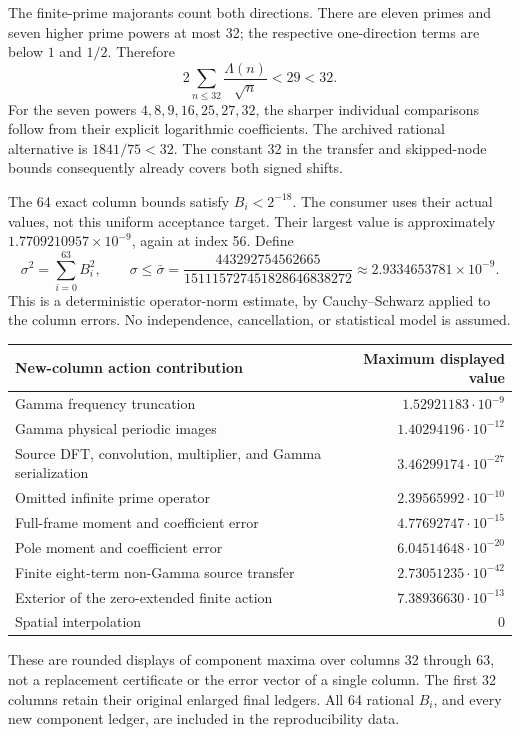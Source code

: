 \documentclass[11pt,a4paper]{article}
\numberwithin{equation}{section}
\theoremstyle{definition}\newtheorem{definition}[theorem]{Definition}
\theoremstyle{remark}\newtheorem{remark}[theorem]{Remark}
\begin{document}
The finite-prime majorants count both directions. There are eleven primes and seven higher prime powers at most 32; the respective one-direction terms are below $1$ and $1/2$. Therefore
\begin{equation}\label{eq:prime32directions}
 2\sum_{n\le32}\frac{\Lambda(n)}{\sqrt n}<29<32.
\end{equation}
For the seven powers $4,8,9,16,25,27,32$, the sharper individual comparisons follow from their explicit logarithmic coefficients. The archived rational alternative is $1841/75<32$. The constant 32 in the transfer and skipped-node bounds consequently already covers both signed shifts.

The 64 exact column bounds satisfy $B_i<2^{-18}$. The consumer uses their actual values, not this uniform acceptance target. Their largest value is approximately $1.7709210957\times10^{-9}$, again at index 56. Define
\begin{equation}\label{eq:sigma64}
 \sigma^2=\sum_{i=0}^{63}B_i^2,\qquad
 \sigma\le\bar\sigma=
 \frac{443292754562665}{151115727451828646838272}
 \approx2.9334653781\times10^{-9}.
\end{equation}
This is a deterministic operator-norm estimate, by Cauchy--Schwarz applied to the column errors. No independence, cancellation, or statistical model is assumed.

\begingroup\small
\begin{longtable}{>{\raggedright\arraybackslash}p{.67\linewidth}r}
\toprule
New-column action contribution & Maximum displayed value\\
\midrule\endhead
Gamma frequency truncation & $1.52921183\cdot10^{-9}$\\
Gamma physical periodic images & $1.40294196\cdot10^{-12}$\\
Source DFT, convolution, multiplier, and Gamma serialization & $3.46299174\cdot10^{-27}$\\
Omitted infinite prime operator & $2.39565992\cdot10^{-10}$\\
Full-frame moment and coefficient error & $4.77692747\cdot10^{-15}$\\
Pole moment and coefficient error & $6.04514648\cdot10^{-20}$\\
Finite eight-term non-Gamma source transfer & $2.73051235\cdot10^{-42}$\\
Exterior of the zero-extended finite action & $7.38936630\cdot10^{-13}$\\
Spatial interpolation & $0$\\
\bottomrule
\end{longtable}
\endgroup
These are rounded displays of component maxima over columns 32 through 63, not a replacement certificate or the error vector of a single column. The first 32 columns retain their original enlarged final ledgers. All 64 rational $B_i$, and every new component ledger, are included in the reproducibility data.
\end{document}
